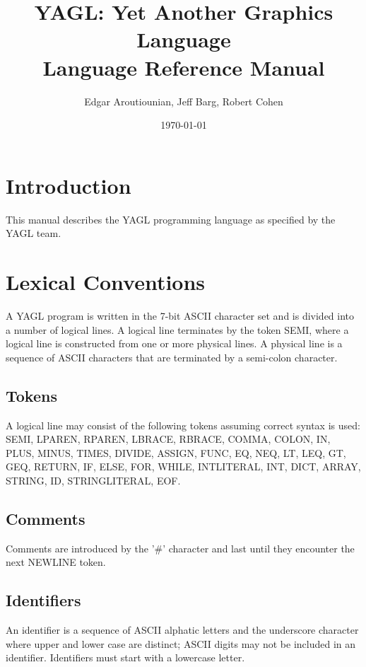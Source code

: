 \documentclass[12pt]{article}
\begin{document}
\title{YAGL: Yet Another Graphics Language\\Language Reference Manual}
\author{Edgar Aroutiounian, Jeff Barg, Robert Cohen}
\date{\today}
\maketitle


\section{Introduction}
This manual describes the YAGL programming language as specified by the YAGL team. 

\section{Lexical Conventions}
A YAGL program is written in the 7-bit ASCII character set and is divided into a number of logical lines. A logical line terminates by the token SEMI, where a logical line is constructed from one or more physical lines. A physical line is a sequence of ASCII characters that are terminated by a semi-colon character.

\subsection{Tokens}
A logical line may consist of the following tokens assuming correct syntax is used: \\
SEMI, LPAREN, RPAREN, LBRACE, RBRACE, COMMA, COLON, IN, PLUS, MINUS, TIMES, DIVIDE, ASSIGN, FUNC, EQ, NEQ, LT, LEQ, GT, GEQ, RETURN, IF, ELSE, FOR, WHILE, INTLITERAL, INT, DICT, ARRAY, STRING, ID, STRINGLITERAL, EOF.

\subsection{Comments} 
Comments are introduced by the '\#' character and last until they encounter the next NEWLINE token.

\subsection{Identifiers}
An identifier is a sequence of ASCII alphatic letters and the underscore character where upper and lower case are distinct; ASCII digits may not be included in an identifier.  Identifiers must start with a lowercase letter.
\end{document}

